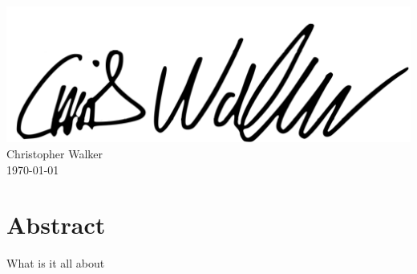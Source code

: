 \documentclass[oneside]{scrbook}
\begin{document}
\begin{titlepage}
\begin{flushleft}
\includegraphics[scale=0.7]{lib/signature.png} \\

Christopher Walker \\ \today
\end{flushleft}

\end{titlepage}

\frontmatter


\section*{Abstract}

What is it all about

\newpage








\tableofcontents
\listoffigures
\listoftables

\mainmatter









\end{document}
